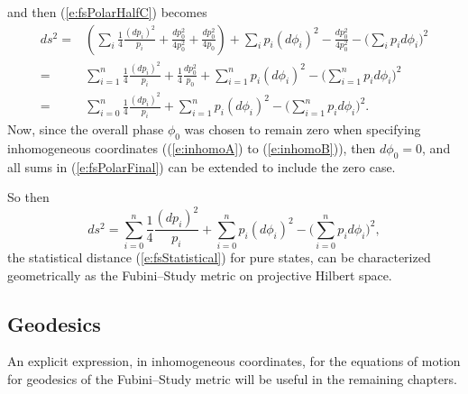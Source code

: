 and then (\ref{e:fsPolarHalfC}) becomes
\begin{equation}
\begin{split}
ds^2 =& 
    \left(
        \sum_i\frac{1}{4}\frac{(dp_i)^2}{p_i}
        + \frac{dp_0^2}{4p_0^2}
        + \frac{dp_0^2}{4p_0}
    \right)
    + \sum_i p_i\left(d\phi_i\right)^2
    - \frac{dp_0^2}{4p_0^2}
    - \biggl(\sum_i p_id\phi_i\biggr)^2\\
  =& 
    \sum_{i=1}^n\frac{1}{4}\frac{(dp_i)^2}{p_i}
    + \frac{1}{4}\frac{dp_0^2}{p_0}
    + \sum_{i=1}^n p_i\left(d\phi_i\right)^2
    - \biggl(\sum_{i=1}^n p_id\phi_i\biggr)^2\\
  =& 
    \sum_{i=0}^n\frac{1}{4}\frac{(dp_i)^2}{p_i}
    + \sum_{i=1}^n p_i\left(d\phi_i\right)^2
    - \biggl(\sum_{i=1}^n p_id\phi_i\biggr)^2.
\end{split}
\label{e:fsPolarFinal}
\end{equation}
Now, since the overall phase $\phi_0$ was chosen to remain 
zero when specifying inhomogeneous coordinates ((\ref{e:inhomoA})
to (\ref{e:inhomoB})), then $d\phi_0 = 0$, and all sums in 
(\ref{e:fsPolarFinal}) can be extended to include the zero case.

So then
\begin{equation}
ds^2 = \sum_{i=0}^n\frac{1}{4}\frac{(dp_i)^2}{p_i}
    + \sum_{i=0}^n p_i\left(d\phi_i\right)^2
    - \biggl(\sum_{i=0}^n p_id\phi_i\biggr)^2,
\end{equation}
the statistical distance (\ref{e:fsStatistical}) for pure states,
can be characterized geometrically as the Fubini--Study metric on
projective Hilbert space.

\subsection{Geodesics}

An explicit expression, in inhomogeneous coordinates, 
for the equations of motion 
for geodesics of the Fubini--Study metric will be useful
in the remaining chapters. 

